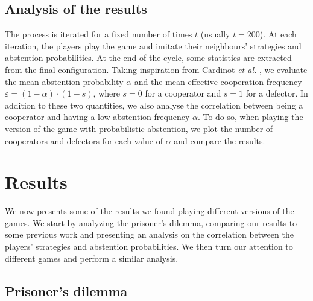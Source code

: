 \documentclass[12pt,oneside,a4paper,fleqn]{article}
\begin{document}
\subsection{Analysis of the results}
The process is iterated for a fixed number of times $t$ (usually $t=200$).
At each iteration, the players play the game and imitate their neighbours' strategies and abstention probabilities.
At the end of the cycle, some statistics are extracted from the final configuration.
Taking inspiration from Cardinot \emph{et al.} \cite{cardinot2018}, we evaluate the mean abstention probability $\alpha$ and the mean effective cooperation frequency $\varepsilon = (1-\alpha)\cdot (1-s)$, where $s = 0$ for a cooperator and $s=1$ for a defector.
In addition to these two quantities, we also analyse the correlation between being a cooperator and having a low abstention frequency $\alpha$.
To do so, when playing the version of the game with probabilistic abstention, we plot the number of cooperators and defectors for each value of $\alpha$ and compare the results.


\section{Results}
\label{sec:results}
We now presents some of the results we found playing different versions of the games. We start by analyzing the prisoner's dilemma, comparing our results to some previous work and presenting an analysis on the correlation between the players' strategies and abstention probabilities. We then turn our attention to different games and perform a similar analysis.
\subsection{Prisoner's dilemma}
\end{document}
